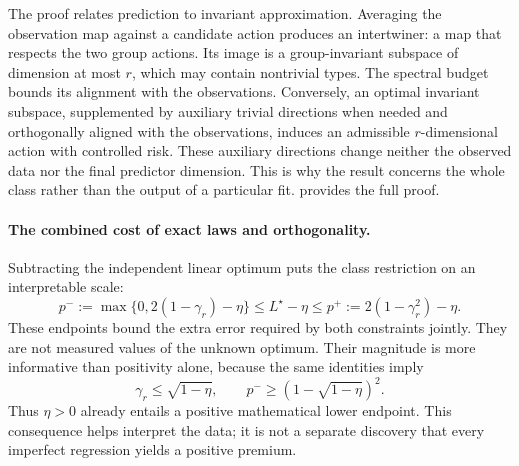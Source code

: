 The proof relates prediction to invariant approximation. Averaging the observation map against a candidate action produces an intertwiner: a map that respects the two group actions. Its image is a group-invariant subspace of dimension at most $r$, which may contain nontrivial types. The spectral budget bounds its alignment with the observations. Conversely, an optimal invariant subspace, supplemented by auxiliary trivial directions when needed and orthogonally aligned with the observations, induces an admissible $r$-dimensional action with controlled risk. These auxiliary directions change neither the observed data nor the final predictor dimension. This is why the result concerns the whole class rather than the output of a particular fit.  provides the full proof.

\paragraph{The combined cost of exact laws and orthogonality.}
Subtracting the independent linear optimum puts the class restriction on an interpretable scale:
\begin{equation}
 p^-:=\max\{0,2(1-\gamma_r)-\eta\}
 \le L^\star-\eta\le
 p^+:=2(1-\gamma_r^2)-\eta.
 \label{eq:risk-premium-main}
\end{equation}
These endpoints bound the extra error required by both constraints jointly. They are not measured values of the unknown optimum. Their magnitude is more informative than positivity alone, because the same identities imply
\begin{equation}
 \gamma_r\le\sqrt{1-\eta},\qquad
 p^-\ge(1-\sqrt{1-\eta})^2.
 \label{eq:positivity-main}
\end{equation}
Thus $\eta>0$ already entails a positive mathematical lower endpoint. This consequence helps interpret the data; it is not a separate discovery that every imperfect regression yields a positive premium.

